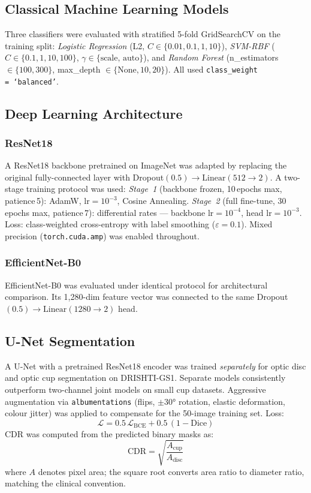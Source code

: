 \documentclass[conference]{IEEEtran}
\begin{document}
\subsection{Classical Machine Learning Models}
Three classifiers were evaluated with stratified 5-fold
GridSearchCV on the training split: \textit{Logistic Regression}
(L2, $C \in \{0.01, 0.1, 1, 10\}$), \textit{SVM-RBF}
($C \in \{0.1, 1, 10, 100\}$, $\gamma \in \{\text{scale, auto}\}$),
and \textit{Random Forest} (n\_estimators $\in \{100,300\}$,
max\_depth $\in \{\text{None},10,20\}$). All used
\texttt{class\_weight\,=\,`balanced'}.
 
\subsection{Deep Learning Architecture}
 
\subsubsection{ResNet18}
A ResNet18 backbone pretrained on ImageNet was adapted by replacing
the original fully-connected layer with
Dropout$(0.5) \!\to\! \text{Linear}(512\!\to\!2)$.
A two-stage training protocol was used:
\textit{Stage~1} (backbone frozen, 10\,epochs max, patience\,5):
AdamW, $\text{lr}\!=\!10^{-3}$, Cosine Annealing.
\textit{Stage~2} (full fine-tune, 30\,epochs max, patience\,7):
differential rates — backbone $\text{lr}\!=\!10^{-4}$, head
$\text{lr}\!=\!10^{-3}$. Loss: class-weighted cross-entropy with
label smoothing ($\varepsilon\!=\!0.1$). Mixed precision
(\texttt{torch.cuda.amp}) was enabled throughout.
 
\subsubsection{EfficientNet-B0}
EfficientNet-B0 was evaluated under identical protocol for
architectural comparison. Its 1,280-dim feature vector was
connected to the same Dropout$(0.5)\!\to\!\text{Linear}(1280\!\to\!2)$
head.
 
\subsection{U-Net Segmentation}
A U-Net with a pretrained ResNet18 encoder was trained
\textit{separately} for optic disc and optic cup segmentation on
DRISHTI-GS1. Separate models consistently outperform two-channel
joint models on small cup datasets. Aggressive augmentation via
\texttt{albumentations} (flips, $\pm 30°$ rotation, elastic
deformation, colour jitter) was applied to compensate for the
50-image training set. Loss:
\begin{equation}
  \mathcal{L} = 0.5\,\mathcal{L}_{\text{BCE}}
              + 0.5\,(1 - \text{Dice})
  \label{eq:loss}
\end{equation}
CDR was computed from the predicted binary masks as:
\begin{equation}
  \text{CDR} = \sqrt{\frac{A_{\text{cup}}}{A_{\text{disc}}}}
  \label{eq:cdr}
\end{equation}
where $A$ denotes pixel area; the square root converts area
ratio to diameter ratio, matching the clinical convention.
 
\end{document}
